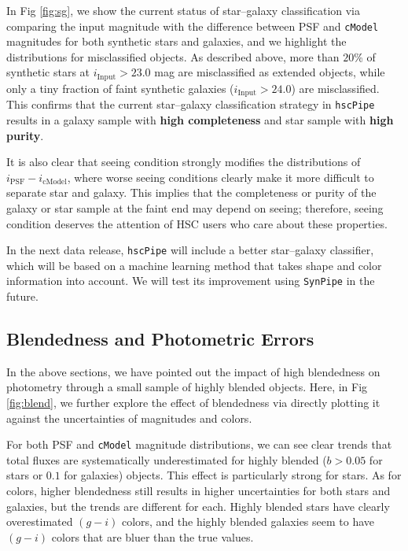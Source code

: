 \documentclass[useamsfonts]{pasj01}
\def\hscpipe{\texttt{hscPipe}}
\def\synpipe{\texttt{SynPipe}}
\def\cmodel{\texttt{cModel}}
\begin{document}
    In Fig \ref{fig:sg}, we show the current status of star--galaxy classification  
    via comparing the input magnitude with the difference between PSF and \cmodel{} 
    magnitudes for both synthetic stars and galaxies, and we highlight the distributions 
    for misclassified objects. 
    As described above, more than $20$\% of synthetic stars at 
    $i_{\mathrm{Input}}>23.0$ mag are misclassified as extended objects, while only a 
    tiny fraction of faint synthetic galaxies ($i_{\mathrm{Input}}>24.0$) are 
    misclassified. 
    This confirms that the current star--galaxy classification strategy in \hscpipe{}
    results in a galaxy sample with \textbf{high completeness} and star sample 
    with \textbf{high purity}.
    
    It is also clear that seeing condition strongly modifies the distributions 
    of $i_{\mathrm{PSF}}-i_{\mathrm{cModel}}$, where worse seeing conditions clearly make it 
    more difficult to separate star and galaxy.  
    This implies that the completeness or purity of the galaxy or star sample at the faint end may depend on seeing; therefore, seeing condition deserves the attention of HSC users who care about these properties.      
    
    In the next data release, \hscpipe{} will include a better star--galaxy classifier, which will be based on a machine learning method that takes shape and color information into account. We will test its improvement using \synpipe{} in the future.
    
\subsection{Blendedness and Photometric Errors}
    \label{ssec:blendedness}

    In the above sections, we have pointed out the impact of high blendedness on 
    photometry through a small sample of highly blended objects.  
    Here, in Fig \ref{fig:blend}, we further explore the effect of blendedness via 
    directly plotting it against the uncertainties of magnitudes and colors. 
    
    For both PSF and \cmodel{} magnitude distributions, we can see clear trends that total fluxes are systematically underestimated for highly blended
    ($b>0.05$ for stars or $0.1$ for galaxies) objects. 
    This effect is particularly strong for stars. 
    As for colors, higher blendedness still results in higher uncertainties for both 
    stars and galaxies, but the trends are different for each. 
    Highly blended stars have clearly overestimated $(g-i)$ colors, and the 
    highly blended galaxies seem to have  $(g-i)$ colors that are bluer than the true values. 
    
\end{document}
